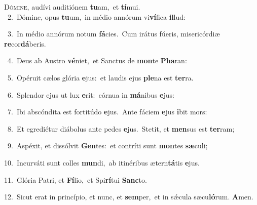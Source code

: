 \lettrine{\initial\textcolor{\initialcolor}{D}}{ómine,} audívi auditiónem \textbf{tu}\-am,~\star et \textbf{tí}\-mui.\\
{\numbfont\textcolor{\numbcolor}{~2.}}~Dómine, opus \textbf{tu}\-um,~\star in médio annórum vi\-\textbf{ví}\-fica \textbf{il}\-lud:\par
{\numbfont\textcolor{\numbcolor}{~3.}}~In médio annórum notum \textbf{fá}\-cies.~\star Cum irátus fúeris, misericórdiæ \textbf{re}\-cor\-\textbf{dá}\-beris.\par
{\numbfont\textcolor{\numbcolor}{~4.}}~Deus ab Austro \textbf{vé}\-niet,~\star et Sanctus de \textbf{mon}\-te \textbf{Pha}\-ran:\par
{\numbfont\textcolor{\numbcolor}{~5.}}~Opéruit cælos glória \textbf{e}\-jus:~\star et laudis ejus \textbf{ple}\-na est \textbf{ter}\-ra.\par
{\numbfont\textcolor{\numbcolor}{~6.}}~Splendor ejus ut lux \textbf{e}\-rit:~\star córnua in \textbf{má}\-nibus \textbf{e}\-jus:\par
{\numbfont\textcolor{\numbcolor}{~7.}}~Ibi abscóndita est fortitúdo \textbf{e}\-jus.~\star Ante fáciem \textbf{e}\-jus \textbf{i}\-bit mors:\par
{\numbfont\textcolor{\numbcolor}{~8.}}~Et egrediétur diábolus ante pedes \textbf{e}\-jus.~\star Stetit, et \textbf{men}\-sus est \textbf{ter}\-ram;\par
{\numbfont\textcolor{\numbcolor}{~9.}}~Aspéxit, et dissólvit \textbf{Gen}\-tes:~\star et contríti sunt \textbf{mon}\-tes \textbf{sæ}\-culi;\par
{\numbfont\textcolor{\numbcolor}{10.}}~Incurváti sunt colles \textbf{mun}\-di,~\star ab itinéribus ætern\-\textbf{tá}\-tis \textbf{e}\-jus.\par
{\numbfont\textcolor{\numbcolor}{11.}}~Glória Patri, et \textbf{Fí}\-lio,~\star et Spi\-\textbf{rí}\-tui \textbf{Sanc}\-to.\par
{\numbfont\textcolor{\numbcolor}{12.}}~Sicut erat in princípio, et nunc, et \textbf{sem}\-per,~\star et in sǽcula sæcu\-\textbf{ló}\-rum. \textbf{A}\-men.\par
